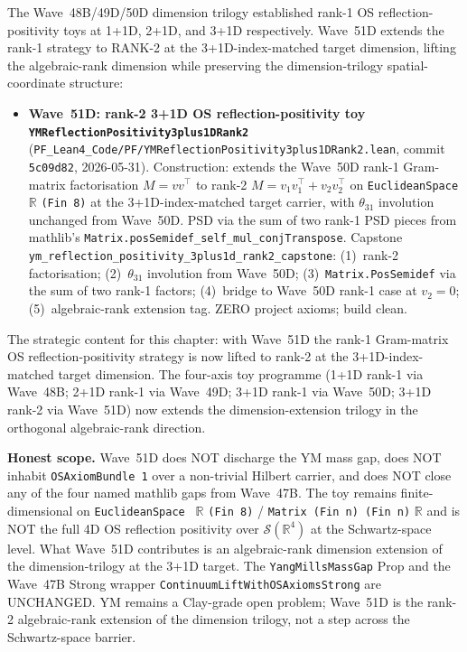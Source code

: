 \begin{remark}\label{rem:ym-wave51d-lean}
The Wave~48B/49D/50D dimension trilogy established rank-1 OS reflection-positivity toys at 1+1D, 2+1D, and 3+1D respectively. Wave~51D extends the rank-1 strategy to RANK-2 at the 3+1D-index-matched target dimension, lifting the algebraic-rank dimension while preserving the dimension-trilogy spatial-coordinate structure:
\begin{itemize}
  \item \textbf{Wave~51D: rank-2 3+1D OS reflection-positivity toy \texttt{YMReflectionPositivity3plus1DRank2}} (\texttt{PF\_Lean4\_Code/PF/YMReflectionPositivity3plus1DRank2.lean}, commit \texttt{5c09d82}, 2026-05-31). Construction: extends the Wave~50D rank-1 Gram-matrix factorisation $M = v v^\top$ to rank-2 $M = v_1 v_1^\top + v_2 v_2^\top$ on \texttt{EuclideanSpace } $\mathbb{R}$ \texttt{(Fin 8)} at the 3+1D-index-matched target carrier, with $\theta_{31}$ involution unchanged from Wave~50D. PSD via the sum of two rank-1 PSD pieces from mathlib's \texttt{Matrix.posSemidef\_self\_mul\_conjTranspose}. Capstone \texttt{ym\_reflection\_positivity\_3plus1d\_rank2\_capstone}: (1)~rank-2 factorisation; (2)~$\theta_{31}$ involution from Wave~50D; (3)~\texttt{Matrix.PosSemidef} via the sum of two rank-1 factors; (4)~bridge to Wave~50D rank-1 case at $v_2 = 0$; (5)~algebraic-rank extension tag. ZERO project axioms; build clean.
\end{itemize}
The strategic content for this chapter: with Wave~51D the rank-1 Gram-matrix OS reflection-positivity strategy is now lifted to rank-2 at the 3+1D-index-matched target dimension. The four-axis toy programme (1+1D rank-1 via Wave~48B; 2+1D rank-1 via Wave~49D; 3+1D rank-1 via Wave~50D; 3+1D rank-2 via Wave~51D) now extends the dimension-extension trilogy in the orthogonal algebraic-rank direction.

\textbf{Honest scope.} Wave~51D does NOT discharge the YM mass gap, does NOT inhabit \texttt{OSAxiomBundle 1} over a non-trivial Hilbert carrier, and does NOT close any of the four named mathlib gaps from Wave~47B. The toy remains finite-dimensional on \texttt{EuclideanSpace } $\mathbb{R}$ \texttt{(Fin 8)} / \texttt{Matrix (Fin n) (Fin n)} $\mathbb{R}$ and is NOT the full 4D OS reflection positivity over $\mathcal{S}(\mathbb{R}^4)$ at the Schwartz-space level. What Wave~51D contributes is an algebraic-rank dimension extension of the dimension-trilogy at the 3+1D target. The \texttt{YangMillsMassGap} Prop and the Wave~47B Strong wrapper \texttt{ContinuumLiftWithOSAxiomsStrong} are UNCHANGED. YM remains a Clay-grade open problem; Wave~51D is the rank-2 algebraic-rank extension of the dimension trilogy, not a step across the Schwartz-space barrier.
\end{remark}

